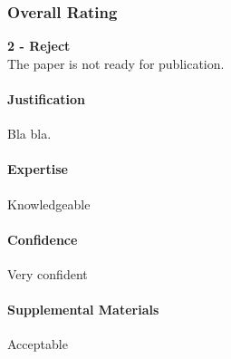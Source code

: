 \subsubsection*{Overall Rating}
\textbf{2 - Reject} \\
The paper is not ready for publication.

\paragraph{Justification}
Bla bla.

\paragraph{Expertise}
Knowledgeable

\paragraph{Confidence}
Very confident

\paragraph{Supplemental Materials}
Acceptable
